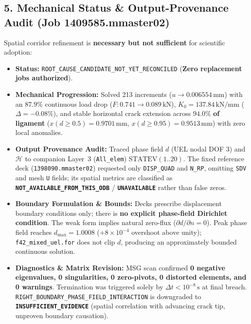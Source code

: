 \documentclass[10pt,a4paper]{article}
\begin{document}
\vspace{-0.25em}
\subsection*{5. Mechanical Status \& Output-Provenance Audit (Job 1409585.mmaster02)}
\vspace{-0.25em}
Spatial corridor refinement is \textbf{necessary but not sufficient} for scientific adoption:
\begin{itemize}[itemsep=0.3pt,topsep=0.2pt,leftmargin=4mm]
  \small
  \item \textbf{Status:} \texttt{ROOT\_CAUSE\_CANDIDATE\_NOT\_YET\_RECONCILED} (\textbf{Zero replacement jobs authorized}).
  \item \textbf{Mechanical Progression:} Solved 213 increments ($u \to 0.006554\,\mathrm{mm}$) with an $87.9\%$ continuous load drop ($F: 0.741 \to 0.089\,\mathrm{kN}$), $K_0 = 137.84\,\mathrm{kN/mm}$ ($\Delta = -0.08\%$), and stable horizontal crack extension across $\mathbf{94.0\%}$ \textbf{of ligament} ($x(d \ge 0.5) = 0.9701\,\mathrm{mm}$, $x(d \ge 0.95) = 0.9513\,\mathrm{mm}$) with zero local anomalies.
  \item \textbf{Output Provenance Audit:} Traced phase field $d$ (UEL nodal DOF 3) and $\mathcal{H}$ to companion Layer~3 (\texttt{All\_elem}) $\mathrm{STATEV}(1..20)$. The fixed reference deck (\texttt{1398090.mmaster02}) requested only \texttt{DISP\_QUAD} and \texttt{N\_RP}, omitting \texttt{SDV} and mesh \texttt{U} fields; its spatial metrics are classified as \textbf{\texttt{NOT\_AVAILABLE\_FROM\_THIS\_ODB}} / \textbf{\texttt{UNAVAILABLE}} rather than false zeros.
  \item \textbf{Boundary Formulation \& Bounds:} Decks prescribe displacement boundary conditions only; there is \textbf{no explicit phase-field Dirichlet condition}. The weak form implies natural zero-flux ($\partial d/\partial n = 0$). Peak phase field reaches $d_{\max} = 1.0008$ ($+8\times 10^{-4}$ overshoot above unity); \texttt{f42\_mixed\_uel.for} does not clip $d$, producing an approximately bounded continuous solution.
  \item \textbf{Diagnostics \& Matrix Revision:} MSG scan confirmed \textbf{0 negative eigenvalues, 0 singularities, 0 zero-pivots, 0 distorted elements, and 0 warnings}. Termination was triggered solely by $\Delta t < 10^{-8}\,\mathrm{s}$ at final breach. \texttt{RIGHT\_BOUNDARY\_PHASE\_FIELD\_INTERACTION} is downgraded to \textbf{\texttt{INSUFFICIENT\_EVIDENCE}} (spatial correlation with advancing crack tip, unproven boundary causation).
\end{itemize}
\end{document}
